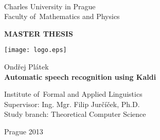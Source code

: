
\begin{titlepage}
\begin{center}
\ \\

\vspace{15mm}

\large
Charles University in Prague\\
Faculty of~Mathematics and Physics\\

\vspace{5mm}

{\Large\bf MASTER THESIS}

\vspace{15mm}

\texttt{[image: logo.eps]} %

\vspace{20mm}
{\Large Ondřej Plátek}\\ 

\vspace{5mm}
{\Large\bf Automatic speech recognition using Kaldi}

\vspace{20mm}
\large
\noindent
Institute of~Formal and Applied Linguistics\\
\noindent
Supervisor: Ing. Mgr. Filip Jurčíček, Ph.D.\\
\noindent
Study branch: Theoretical Computer Science\\
\end{center}
\vspace{20mm}
\begin{center}
Prague 2013
\end{center}

\end{titlepage} %


\begin{figure}[htp] 
\end{figure}  

\newpage
\begin{figure}[htp] 
\end{figure}  

